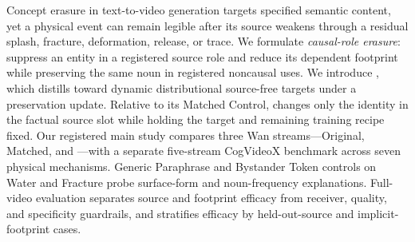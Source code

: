 Concept erasure in text-to-video generation targets specified semantic
content, yet a physical event can remain legible after its source weakens
through a residual splash, fracture, deformation, release, or trace.  We
formulate \emph{causal-role erasure}: suppress an entity in a registered source
role and reduce its dependent footprint while preserving the same noun in
registered noncausal uses.  We introduce \methodname, which distills toward
dynamic distributional source-free targets under a preservation update.
Relative to its Matched Control, \methodshort{} changes only the identity in the
factual source slot while holding the target and remaining training recipe
fixed.  Our registered main study compares three Wan streams---Original,
Matched, and \methodshort{}---with a separate five-stream CogVideoX benchmark
across seven physical mechanisms.  Generic Paraphrase and Bystander Token
controls on Water and Fracture probe surface-form and noun-frequency
explanations.  Full-video evaluation separates source and footprint efficacy
from receiver, quality, and specificity guardrails, and stratifies efficacy by
held-out-source and implicit-footprint cases.

